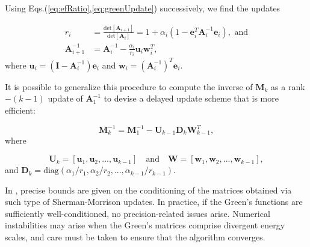 Using Eqs.(\ref{eq:efRatio},\ref{eq:greenUpdate}) successively, we find the updates

\begin{equation}
\begin{split}
r_i &= \frac{\text{det}[\bm A_{i+1}]}{\text{det}[\bm A_{i}]} = 1 + \alpha_i ( 1 - \bm e_i^T \bm A_i^{-1}  \bm e_i ) , \,\, \text{and} \\
\bm A_{i+1}^{-1} &= \bm A_i^{-1} - \frac{\alpha_i}{r_i} \bm u_i \bm w_i^T ,
\end{split}
\end{equation}
where $\bm u_i = (\bm I - \bm A_i^{-1} ) \bm e_i$ and $\bm w_i = (\bm A_i^{-1})^T \bm e_i$.

It is possible to generalize this procedure to compute the inverse of $\bm M_k$ as a rank$-(k-1)$ update of $\bm A_1^{-1}$ to devise a delayed update scheme that is more efficient:

\begin{equation}
\bm M_k^{-1} = \bm M_1^{-1} - \bm U_{k-1} \bm D_k \bm W_{k-1}^T ,
\end{equation}
where

\begin{equation}
\bm U_k = [ \bm u_1 , \bm u_2, ..., \bm u_{k-1} ] \quad \text{and} \quad \bm W = [ \bm w_1, \bm w_2, ..., \bm w_{k-1} ] ,
\end{equation}
and $\bm D_k = \text{diag}(\alpha_1 / r_1, \alpha_2 / r_2, ..., \alpha_{k-1} / r_{k-1})$.

In \cite{yip_note_1986}, precise bounds are given on the conditioning of the matrices obtained via such type of Sherman-Morrison updates.
In practice, if the Green's functions are sufficiently well-conditioned, no precision-related issues arise.
Numerical instabilities may arise when the Green's matrices comprise divergent energy scales, and care must be taken to ensure that the algorithm converges.